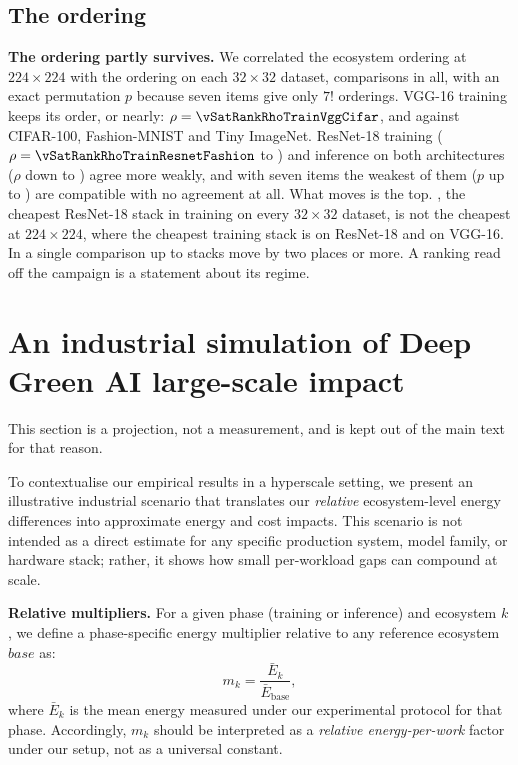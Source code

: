 \subsection{The ordering}
\label{app:sat-order}

\textbf{The ordering partly survives.} We correlated the ecosystem ordering at
$224\times224$ with the ordering on each $32\times32$ dataset,
\vSatRankComparisons{} comparisons in all, with an exact permutation $p$ because
seven items give only $7!$ orderings. VGG-16 training keeps its order, or nearly: $\rho =
\vSatRankRhoTrainVggCifar$, \vSatRankRhoTrainVggFashion{} and
\vSatRankRhoTrainVggTiny{} against CIFAR-100, Fashion-MNIST and Tiny ImageNet.
ResNet-18 training ($\rho = \vSatRankRhoTrainResnetFashion$ to
\vSatRankRhoTrainResnetTiny) and inference on both architectures ($\rho$ down to
\vSatRankRhoMin) agree more weakly, and with seven items the weakest of them
($p$ up to \vSatRankPermMax) are compatible with no agreement at all. What moves
is the top. \vSatRefBestTrainResnet{}, the cheapest ResNet-18 stack in
training on every $32\times32$ dataset, is not the cheapest at $224\times224$,
where the cheapest training stack is \vSatBestTrainResnet{} on ResNet-18 and
\vSatBestTrainVgg{} on VGG-16. In a single comparison up to \vSatRankMovedMax{}
stacks move by two places or more. A ranking read off the campaign is a
statement about its regime.

\section{An industrial simulation of Deep Green AI large-scale impact}
\label{sec:scenario}

This section is a projection, not a measurement, and is kept out of the main text
for that reason.

To contextualise our empirical results in a hyperscale setting, we present an illustrative industrial scenario that translates our \emph{relative} ecosystem-level energy differences into approximate energy and cost impacts.
This scenario is not intended as a direct estimate for any specific production system, model family, or hardware stack; rather, it shows how small per-workload gaps can compound at scale.

\textbf{Relative multipliers.}
For a given phase (training or inference) and ecosystem $k$, we define a phase-specific energy multiplier relative to any reference ecosystem $base$ as:
\[
m_k = \frac{\bar{E}_k}{\bar{E}_{\text{base}}},
\]
where $\bar{E}_k$ is the mean energy measured under our experimental protocol for that phase.
Accordingly, $m_k$ should be interpreted as a \emph{relative energy-per-work} factor under our setup, not as a universal constant.


